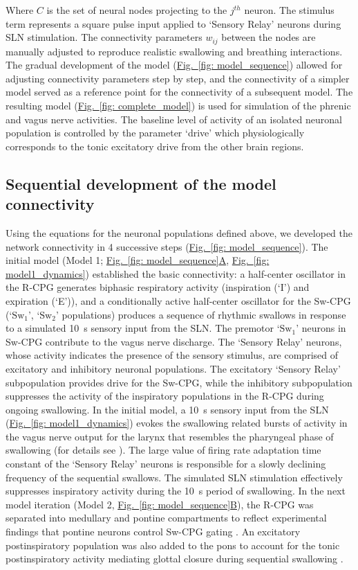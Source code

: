 \documentclass[pdflatex,sn-mathphys-ay]{sn-jnl}%
\renewcommand{\figureautorefname}{Fig.}
\newcommand{\Figref}[2][]{\hyperref[#2]{\figureautorefname~\ref*{#2}#1}}
\theoremstyle{thmstyleone}%
\theoremstyle{thmstyletwo}%
\theoremstyle{thmstylethree}%
\begin{document}
Where $C$ is the set of neural nodes projecting to the $j^{th}$ neuron.
The stimulus term represents a square pulse input applied to `Sensory Relay' neurons during SLN stimulation.
The connectivity parameters $w_{ij}$ between the nodes are manually adjusted to reproduce realistic swallowing and breathing interactions. The gradual development of the model (\Figref[]{fig: model_sequence}) allowed for adjusting connectivity parameters step by step, and the connectivity of a simpler model served as a reference point for the connectivity of a subsequent model. The resulting model (\Figref[]{fig: complete_model}) is used for simulation of the phrenic and vagus nerve activities. The baseline level of activity of an isolated neuronal population is controlled by the parameter `drive' which physiologically corresponds to the tonic excitatory drive from the other brain regions.

\subsection{Sequential development of the model connectivity}
Using the equations for the neuronal populations defined above, we developed the network connectivity in 4 successive steps (\Figref[]{fig: model_sequence}). 
The initial model (Model 1; \Figref[A]{fig: model_sequence}, \Figref[]{fig: model1_dynamics}) established the basic connectivity: a half-center oscillator in the R-CPG generates biphasic respiratory activity (inspiration (`I') and expiration (`E')), and a conditionally active half-center oscillator for the Sw-CPG (`$\text{Sw}_1$', `$\text{Sw}_2$' populations) produces a sequence of rhythmic swallows in response to a simulated 10~s sensory input from the SLN. The premotor `$\text{Sw}_1$' neurons in Sw-CPG contribute to the vagus nerve discharge. The ‘Sensory Relay’ neurons, whose activity indicates the presence of the sensory stimulus, are comprised of excitatory and inhibitory neuronal populations. The excitatory `Sensory Relay' subpopulation provides drive for the Sw-CPG, while the inhibitory subpopulation suppresses the activity of the inspiratory populations in the R-CPG during ongoing swallowing. In the initial model, a 10~s sensory input from the SLN (\Figref[]{fig: model1_dynamics}) evokes the swallowing related bursts of activity in the vagus nerve output for the larynx that resembles the pharyngeal phase of swallowing (for details see \citep{jean2001brain, bautista2014ponto, lang2009brain}). The large value of firing rate adaptation time constant of the `Sensory Relay' neurons is responsible for a slowly declining frequency of the sequential swallows. The simulated SLN stimulation effectively suppresses inspiratory activity during the 10~s period of swallowing.
In the next model iteration (Model 2, \Figref[B]{fig: model_sequence}), the R-CPG was separated into medullary and pontine compartments to reflect experimental findings that pontine neurons control Sw-CPG gating \citep{bautista2014ponto}. An excitatory postinspiratory population was also added to the pons to account for the tonic postinspiratory activity mediating glottal closure during sequential swallowing \citep{bautista2014ponto}.
\end{document}

